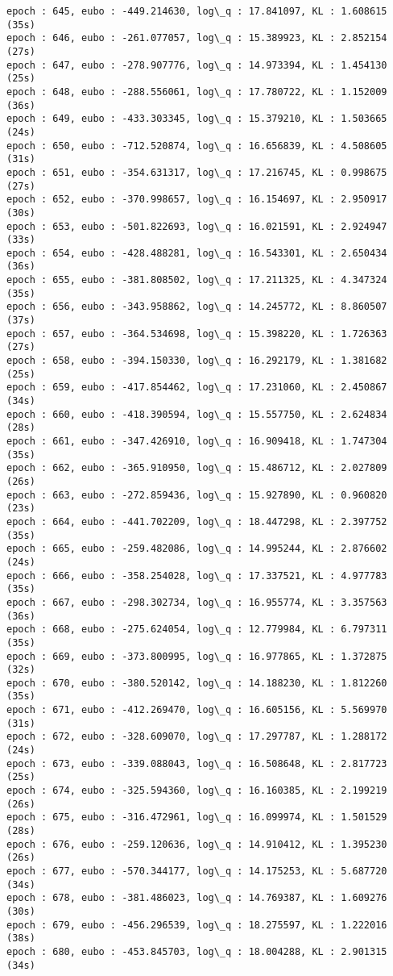 \documentclass[11pt]{article}
\begin{document}
\begin{Verbatim}[commandchars=\\\{\}]
epoch : 645, eubo : -449.214630, log\_q : 17.841097, KL : 1.608615 (35s)
epoch : 646, eubo : -261.077057, log\_q : 15.389923, KL : 2.852154 (27s)
epoch : 647, eubo : -278.907776, log\_q : 14.973394, KL : 1.454130 (25s)
epoch : 648, eubo : -288.556061, log\_q : 17.780722, KL : 1.152009 (36s)
epoch : 649, eubo : -433.303345, log\_q : 15.379210, KL : 1.503665 (24s)
epoch : 650, eubo : -712.520874, log\_q : 16.656839, KL : 4.508605 (31s)
epoch : 651, eubo : -354.631317, log\_q : 17.216745, KL : 0.998675 (27s)
epoch : 652, eubo : -370.998657, log\_q : 16.154697, KL : 2.950917 (30s)
epoch : 653, eubo : -501.822693, log\_q : 16.021591, KL : 2.924947 (33s)
epoch : 654, eubo : -428.488281, log\_q : 16.543301, KL : 2.650434 (36s)
epoch : 655, eubo : -381.808502, log\_q : 17.211325, KL : 4.347324 (35s)
epoch : 656, eubo : -343.958862, log\_q : 14.245772, KL : 8.860507 (37s)
epoch : 657, eubo : -364.534698, log\_q : 15.398220, KL : 1.726363 (27s)
epoch : 658, eubo : -394.150330, log\_q : 16.292179, KL : 1.381682 (25s)
epoch : 659, eubo : -417.854462, log\_q : 17.231060, KL : 2.450867 (34s)
epoch : 660, eubo : -418.390594, log\_q : 15.557750, KL : 2.624834 (28s)
epoch : 661, eubo : -347.426910, log\_q : 16.909418, KL : 1.747304 (35s)
epoch : 662, eubo : -365.910950, log\_q : 15.486712, KL : 2.027809 (26s)
epoch : 663, eubo : -272.859436, log\_q : 15.927890, KL : 0.960820 (23s)
epoch : 664, eubo : -441.702209, log\_q : 18.447298, KL : 2.397752 (35s)
epoch : 665, eubo : -259.482086, log\_q : 14.995244, KL : 2.876602 (24s)
epoch : 666, eubo : -358.254028, log\_q : 17.337521, KL : 4.977783 (35s)
epoch : 667, eubo : -298.302734, log\_q : 16.955774, KL : 3.357563 (36s)
epoch : 668, eubo : -275.624054, log\_q : 12.779984, KL : 6.797311 (35s)
epoch : 669, eubo : -373.800995, log\_q : 16.977865, KL : 1.372875 (32s)
epoch : 670, eubo : -380.520142, log\_q : 14.188230, KL : 1.812260 (35s)
epoch : 671, eubo : -412.269470, log\_q : 16.605156, KL : 5.569970 (31s)
epoch : 672, eubo : -328.609070, log\_q : 17.297787, KL : 1.288172 (24s)
epoch : 673, eubo : -339.088043, log\_q : 16.508648, KL : 2.817723 (25s)
epoch : 674, eubo : -325.594360, log\_q : 16.160385, KL : 2.199219 (26s)
epoch : 675, eubo : -316.472961, log\_q : 16.099974, KL : 1.501529 (28s)
epoch : 676, eubo : -259.120636, log\_q : 14.910412, KL : 1.395230 (26s)
epoch : 677, eubo : -570.344177, log\_q : 14.175253, KL : 5.687720 (34s)
epoch : 678, eubo : -381.486023, log\_q : 14.769387, KL : 1.609276 (30s)
epoch : 679, eubo : -456.296539, log\_q : 18.275597, KL : 1.222016 (38s)
epoch : 680, eubo : -453.845703, log\_q : 18.004288, KL : 2.901315 (34s)

\end{Verbatim}
\end{document}
